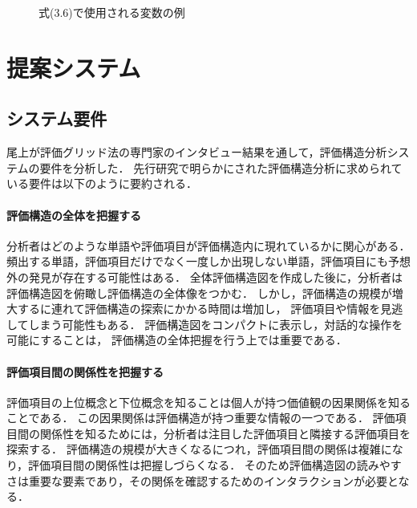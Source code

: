 \documentclass[syuuron]{kuee}
\begin{document}
		\begin{figure}
			\begin{center}
			\end{center}
			\caption{式(3.6)で使用される変数の例}
	  		\label{fig:met3}
		\end{figure}

\chapter{提案システム}
	\section{システム要件}
		尾上が評価グリッド法の専門家のインタビュー結果を通して，評価構造分析システムの要件を分析した\cite{hak1}．
		先行研究で明らかにされた評価構造分析に求められている要件は以下のように要約される．
		\subsubsection{評価構造の全体を把握する}
			分析者はどのような単語や評価項目が評価構造内に現れているかに関心がある．
			頻出する単語，評価項目だけでなく一度しか出現しない単語，評価項目にも予想外の発見が存在する可能性はある．
			全体評価構造図を作成した後に，分析者は評価構造図を俯瞰し評価構造の全体像をつかむ．
			しかし，評価構造の規模が増大するに連れて評価構造の探索にかかる時間は増加し，
			評価項目や情報を見逃してしまう可能性もある．
			評価構造図をコンパクトに表示し，対話的な操作を可能にすることは，
			評価構造の全体把握を行う上では重要である．
		\subsubsection{評価項目間の関係性を把握する}
			評価項目の上位概念と下位概念を知ることは個人が持つ価値観の因果関係を知ることである．
			この因果関係は評価構造が持つ重要な情報の一つである．
			評価項目間の関係性を知るためには，分析者は注目した評価項目と隣接する評価項目を探索する．
			評価構造の規模が大きくなるにつれ，評価項目間の関係は複雑になり，評価項目間の関係性は把握しづらくなる．
			そのため評価構造図の読みやすさは重要な要素であり，その関係を確認するためのインタラクションが必要となる．
\end{document}
